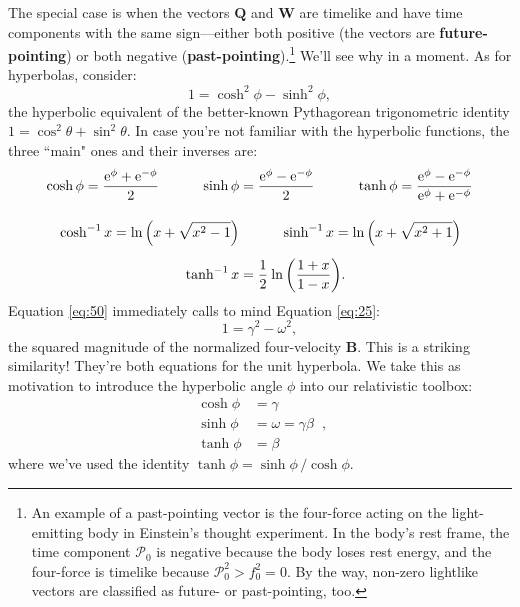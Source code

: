 \documentclass[12pt]{article}
\renewcommand{\vv}[1]{\mathbf{#1}}
\begin{document}
The special case is when the vectors $\vv Q$ and $\vv W$ are timelike and have time components with the same sign---either both positive (the vectors are \textbf{future-pointing}) or both negative (\textbf{past-pointing}).\footnote{\label{fn:nt}An example of a past-pointing vector is the four-force acting on the light-emitting body in Einstein's thought experiment. In the body's rest frame, the time component $\mathcal{P}_0$ is negative because the body loses rest energy, and the four-force is timelike because $\mathcal{P}_0^2 > f_0^2 = 0$. By the way, non-zero lightlike vectors are classified as future- or past-pointing, too.} We'll see why in a moment. As for hyperbolas, consider:
\begin{equation}\label{eq:50}
1 = \cosh^2 {\phi} - \sinh^2 {\phi},
\end{equation}
the hyperbolic equivalent of the better-known Pythagorean trigonometric identity $1 = \cos^2 {\theta} + \sin^2 {\theta}$. In case you're not familiar with the hyperbolic functions, the three ``main" ones and their inverses are:
\begin{equation}\label{eq:hf}
\begin{aligned}
\cosh{\phi} = \dfrac{\mathrm{e}^\phi + \mathrm{e}^{-\phi}}{2} \qquad \quad \sinh{\phi} &= \dfrac{\mathrm{e}^\phi - \mathrm{e}^{-\phi}}{2} \qquad \quad \tanh{\phi} = \dfrac{\mathrm{e}^\phi - \mathrm{e}^{-\phi}}{\mathrm{e}^\phi + \mathrm{e}^{-\phi}} \\[10pt]
\cosh^{-1}{x} = \ln{ \left( x + \sqrt{x^2 - 1} \right)} &\qquad \quad \sinh^{-1}{x} = \ln{ \left( x + \sqrt{x^2 + 1} \right)} \\[5pt]
\tanh^{-1}{x} &= \dfrac{1}{2} \mkern1mu \ln{ \left( \dfrac{1 + x}{1 - x} \right) } .
\end{aligned}
\end{equation}
Equation \ref{eq:50} immediately calls to mind Equation \ref{eq:25}:
\begin{equation*}
1 = \gamma^2 - \omega^2 ,
\end{equation*}
the squared magnitude of the normalized four-velocity $\vv B$. This is a striking similarity! They're both equations for the unit hyperbola. We take this as motivation to introduce the hyperbolic angle $\phi$ into our relativistic toolbox:
\begin{equation}\label{eq:51}
\boxed{
\begin{aligned}
\cosh{\phi} &= \gamma \\
\sinh{\phi} &= \omega = \gamma \beta \\
\tanh{\phi} &= \beta
\end{aligned}
} \, ,
\end{equation}
where we've used the identity $\tanh{\phi} = \sinh{\phi} \, / \cosh{\phi}$.
\end{document}
